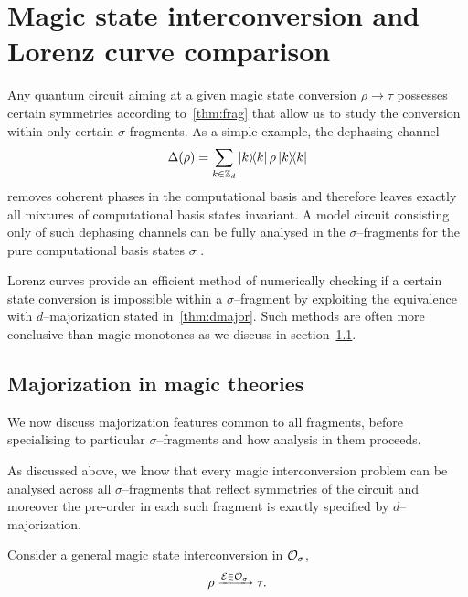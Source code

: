 \documentclass[pra,
aps,
twocolumn,
superscriptaddress,
groupedaddress,
nofootinbib,
reprint
]{revtex4-1}
\begin{document}
 


\section{Magic state interconversion and Lorenz curve comparison}
\label{sec:distill}

Any quantum circuit aiming at a given magic state conversion $\rho \longrightarrow \tau$ possesses certain symmetries according to~\cref{thm:frag} that allow us to study the conversion within only certain $\sigma$-fragments.
As a simple example, the dephasing channel
\begin{equation}\label{eq:dephase}
	\Delta(\rho) = \sum_{k \in \mathbb{Z}_d} \ketbra{k}{k}\rho\ketbra{k}{k}
\end{equation}
removes coherent phases in the computational basis and therefore leaves exactly all mixtures of computational basis states invariant.
A model circuit consisting only of such dephasing channels can be fully analysed in the $\sigma$--fragments for the pure computational basis states $\sigma$ .

Lorenz curves provide an efficient method of numerically checking if a certain state conversion is impossible within a $\sigma$--fragment by exploiting the equivalence with $d$--majorization stated in~\cref{thm:dmajor}.
Such methods are often more conclusive than magic monotones as we discuss in section~\cref{sec:scmana}.

\subsection{Majorization in magic theories}\label{sec:scmana}
We now discuss majorization features common to all fragments, before specialising to particular $\sigma$--fragments and how analysis in them proceeds.

As discussed above, we know that every magic interconversion problem can be analysed across all $\sigma$--fragments that reflect symmetries of the circuit and moreover the pre-order in each such fragment is exactly specified by $d$--majorization.

Consider a general magic state interconversion in $\mathcal{O}_\sigma$, 
\begin{equation}
	\rho \xrightarrow{\mathcal{E} \in \mathcal{O}_\sigma} \tau.
\end{equation}
\end{document}
